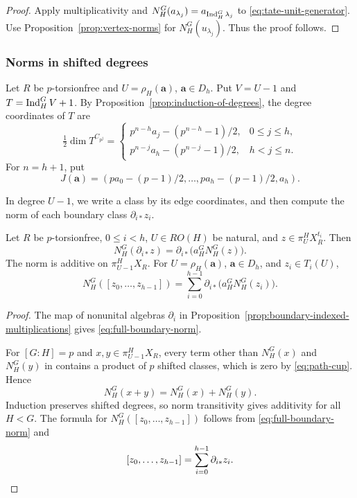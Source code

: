 \begin{proof}
Apply multiplicativity and
$N_H^G(a_{\lambda_j})=a_{\operatorname{Ind}_H^G\lambda_j}$
to \eqref{eq:tate-unit-generator}.
Use Proposition~\ref{prop:vertex-norms} for $N_H^G(u_{\lambda_j})$. Thus the proof follows.
\end{proof}

\subsubsection{Norms in shifted degrees}
Let $R$ be $p$-torsionfree and $U=\rho_H(\mathbf a)$, $\mathbf a\in D_h$.
Put $V=U-1$ and $T=\operatorname{Ind}_H^G V+1$.
By Proposition~\ref{prop:induction-of-degrees}, the degree coordinates of $T$ are
\begin{equation*}
\tfrac12\dim T^{C_{p^j}}=
\begin{cases}
p^{n-h}a_j-(p^{n-h}-1)/2,&0\le j\le h,\\
p^{n-j}a_h-(p^{n-j}-1)/2,&h<j\le n.
\end{cases}
\end{equation*}
For $n=h+1$, put
\begin{equation*}
J(\mathbf a)=(pa_0-(p-1)/2,\ldots,pa_h-(p-1)/2,a_h).
\end{equation*}

In degree $U-1$, we write a class by its edge coordinates, and then
compute the norm of each boundary class $\partial_{i*}z_i$.

\begin{proposition}\label{prop:edge-norms}
Let $R$ be $p$-torsionfree, $0\le i<h$, $U\in RO(H)$ be natural,
and $z\in\pi_U^H X_R^{t_i}$. Then
\begin{equation}\label{eq:full-boundary-norm}
N_H^G(\partial_{i*}z)
=\partial_{i*}\bigl(a_H^GN_H^G(z)\bigr).
\end{equation}
The norm is additive on $\pi_{U-1}^H X_R$.
For $U=\rho_H(\mathbf a)$, $\mathbf a\in D_h$, and $z_i\in T_i(U)$,
\[
N_H^G([z_0,\ldots,z_{h-1}])
=\sum_{i=0}^{h-1}
\partial_{i*}\bigl(a_H^GN_H^G(z_i)\bigr).
\]
\end{proposition}

\begin{proof}
The map of nonunital algebras $\partial_i$ in
Proposition~\ref{prop:boundary-indexed-multiplications}
gives \eqref{eq:full-boundary-norm}.

For $[G:H]=p$ and $x,y\in\pi_{U-1}^H X_R$, every term other
than $N_H^G(x)$ and $N_H^G(y)$ in
\cite[equation~(8.34)]{ZhangHZ} contains a product of
$p$ shifted classes, which is zero by \eqref{eq:path-cup}.
Hence
\[
N_H^G(x+y)=N_H^G(x)+N_H^G(y).
\]
Induction preserves shifted degrees, so norm transitivity
gives additivity for all $H<G$.
The formula for $N_H^G([z_0,\ldots,z_{h-1}])$ follows from
\eqref{eq:full-boundary-norm}
and
\[
[z_0,\ldots,z_{h-1}]
=\sum_{i=0}^{h-1}\partial_{i*}z_i.\qedhere
\]
\end{proof}

